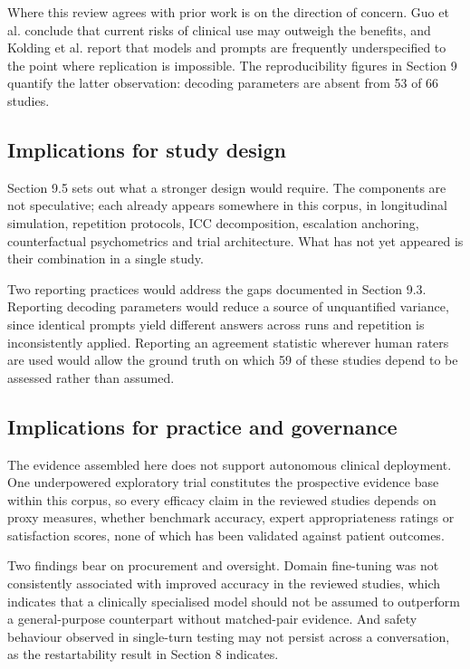 \documentclass[11pt]{article}
\begin{document}
	Where this review agrees with prior work is on the direction of concern. Guo et
	al.\cite{GUO2024} conclude that current risks of clinical use may outweigh the benefits, and
	Kolding et al.\cite{Kolding2025} report that models and prompts are frequently underspecified to
	the point where replication is impossible. The reproducibility figures in Section 9 quantify the
	latter observation: decoding parameters are absent from 53 of 66 studies.
	
	\subsection{Implications for study design}
	
	Section 9.5 sets out what a stronger design would require. The components are not speculative; each
	already appears somewhere in this corpus, in longitudinal simulation, repetition protocols, ICC
	decomposition, escalation anchoring, counterfactual psychometrics and trial architecture. What has
	not yet appeared is their combination in a single study.
	
	Two reporting practices would address the gaps documented in Section 9.3. Reporting decoding
	parameters would reduce a source of unquantified variance, since identical prompts yield different
	answers across runs and repetition is inconsistently applied. Reporting an agreement statistic
	wherever human raters are used would allow the ground truth on which 59 of these studies
	depend to be assessed rather than assumed.
	
	\subsection{Implications for practice and governance}
	
	The evidence assembled here does not support autonomous clinical deployment. One underpowered
	exploratory trial constitutes the prospective evidence base within this corpus, so every efficacy
	claim in the reviewed studies depends on proxy measures, whether benchmark accuracy, expert appropriateness ratings or
	satisfaction scores, none of which has been validated against patient outcomes.
	
	Two findings bear on procurement and oversight. Domain fine-tuning was not consistently associated
	with improved accuracy in the reviewed studies, which indicates that a clinically specialised model
	should not be assumed to outperform a general-purpose counterpart without matched-pair evidence. And
	safety behaviour observed in single-turn testing may not persist across a conversation, as the
	restartability result in Section 8 indicates.
	
\end{document}
